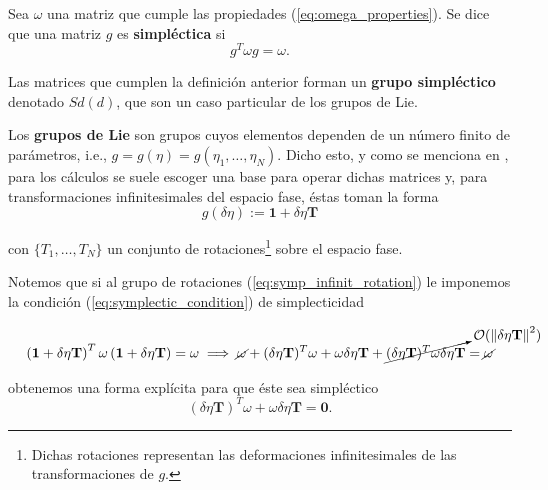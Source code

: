 \begin{definicion}
Sea $\omega$ una matriz que cumple las propiedades (\ref{eq:omega_properties}). Se dice que una matriz $g$ es \textbf{simpléctica} si
\begin{equation}
 g^T \omega g = \omega.
 \label{eq:symplectic_condition}
\end{equation}
\end{definicion}

Las matrices que cumplen la definición anterior forman un \textbf{grupo simpléctico} denotado $Sd(d)$, que son un caso particular de los grupos de Lie.

Los \textbf{grupos de Lie} son grupos cuyos elementos dependen de un número finito de parámetros, i.e., $g = g(\eta) = g(\eta_1,\ldots,\eta_N)$. Dicho esto, y como se menciona en \cite{CBHamiltonianDynamics}, para los cálculos se suele escoger una base para operar dichas matrices y, para transformaciones infinitesimales del espacio fase, éstas toman la forma
\begin{equation}
 g(\delta \eta) := \mathbf{1} + \delta \eta \mathbf{T}
 \label{eq:symp_infinit_rotation}
\end{equation}

con $\lbrace T_1, \ldots, T_N \rbrace$ un conjunto de rotaciones\footnote{Dichas rotaciones representan las deformaciones infinitesimales de las transformaciones de $g$.} sobre el espacio fase.

Notemos que si al grupo de rotaciones (\ref{eq:symp_infinit_rotation}) le imponemos la condición (\ref{eq:symplectic_condition}) de simplecticidad

\begin{align*}
  \left( \mathbf{1} + \delta \eta \mathbf{T} \right)^T \omega \left( \mathbf{1} + \delta \eta \mathbf{T} \right) = \omega \implies 
  \cancel{\omega} + (\delta \eta \mathbf{T})^T \omega + \omega \delta \eta \mathbf{T} + \cancelto{\mathcal{O}(\left\lVert\delta \eta \mathbf{T}\right\rVert^2)} {(\delta \eta \mathbf{T})^T \omega \delta \eta \mathbf{T}} = \cancel{\omega}  
\end{align*}

obtenemos una forma explícita para que éste sea simpléctico
\begin{equation}
  (\delta \eta \mathbf{T})^T \omega + \omega \delta \eta \mathbf{T} = \mathbf{0}.
  \label{eq:eq:symplectic_condition2}
\end{equation}

